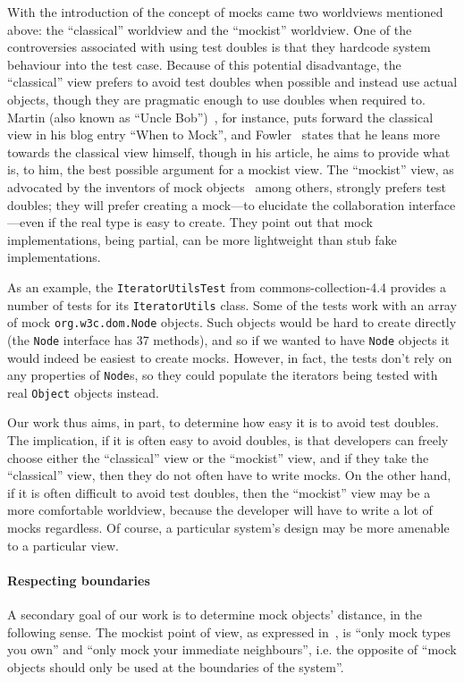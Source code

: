 With the introduction of the concept of mocks came two worldviews mentioned above: the ``classical'' worldview and the ``mockist'' worldview.
One of the controversies associated with using test doubles is that they hardcode system behaviour into the test case. Because of this potential disadvantage, the ``classical'' view prefers to avoid test doubles when possible and instead use actual objects, though they are pragmatic enough to use doubles when required to. Martin (also known as ``Uncle Bob'')~\cite{martin14:_when_mock}, for instance, puts forward the classical view in his blog entry ``When to Mock'', and Fowler~\cite{fowler07:_mocks_arent_stubs} states that he leans more towards the classical view himself, though in his article, he aims to provide what is, to him, the best possible argument for a mockist view. The ``mockist'' view, as advocated by the inventors of mock objects~\cite{freeman04:_mock_roles_objec} among others, strongly prefers test doubles; they will prefer creating a mock---to elucidate the collaboration interface---even if the real type is easy to create. They point out that mock implementations, being partial, can be more lightweight than stub fake implementations.

As an example, the \texttt{IteratorUtilsTest} from commons-collection-4.4 provides a number of tests for its \texttt{IteratorUtils} class. Some of the tests work with an array of mock \texttt{org.w3c.dom.Node} objects. Such objects would be hard to create directly (the \texttt{Node} interface has 37 methods), and so if we wanted to have \texttt{Node} objects it would indeed be easiest to create mocks. However, in fact, the tests don't rely on any properties of \texttt{Node}s, so they could populate the iterators being tested with real \texttt{Object} objects instead.

Our work thus aims, in part, to determine how easy it is to avoid test doubles. The implication, if it is often easy to avoid doubles, is that developers can freely choose either the ``classical'' view or the ``mockist'' view, and if they take the ``classical'' view, then they do not often have to write mocks. On the other hand, if it is often difficult to avoid test doubles, then the ``mockist'' view may be a more comfortable worldview, because the developer will have to write a lot of mocks regardless. Of course, a particular system's design may be more amenable to a particular view.



\paragraph{Respecting boundaries} A secondary goal of our work is to determine mock objects' distance, in the following sense.
The mockist point of view, as expressed
in~\cite{freeman04:_mock_roles_objec}, is ``only mock types you own'' and ``only mock your immediate
neighbours'', i.e. the opposite of ``mock objects should only be used
at the boundaries of the system''. 

